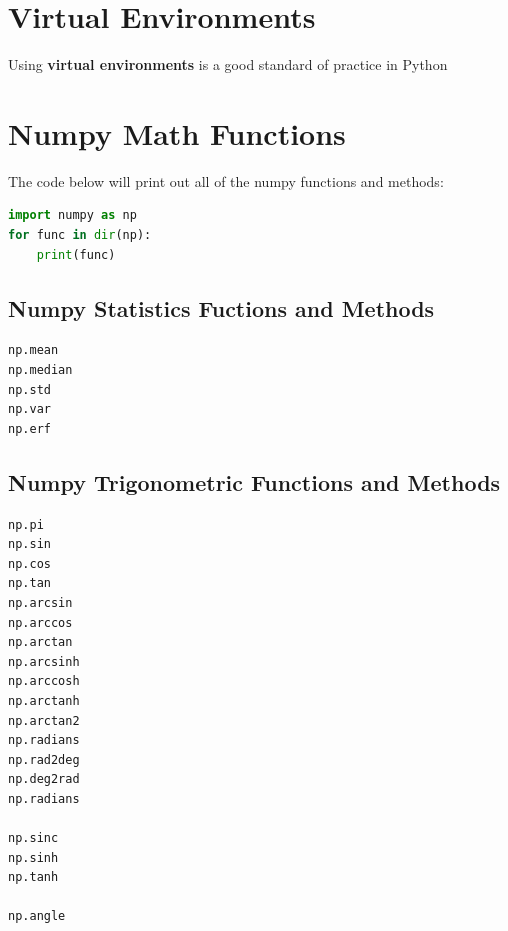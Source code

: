 \documentclass{book}
\begin{document}
    
        \section{Virtual Environments}\label{virtual-environments}
    




    
        Using \textbf{virtual environments} is a good standard of practice in
Python
    




    
        \section{Numpy Math Functions}\label{numpy-math-functions}
    




    
        The code below will print out all of the numpy functions and methods:
    




    
        \begin{lstlisting}[language=Python]
import numpy as np
for func in dir(np):
    print(func)
\end{lstlisting}
    




    
        \subsection{Numpy Statistics Fuctions and
Methods}\label{numpy-statistics-fuctions-and-methods}
    




    
        \begin{lstlisting}
np.mean
np.median
np.std
np.var
np.erf
\end{lstlisting}
    




    
        \subsection{Numpy Trigonometric Functions and
Methods}\label{numpy-trigonometric-functions-and-methods}
    




    
        \begin{lstlisting}
np.pi
np.sin
np.cos
np.tan
np.arcsin
np.arccos
np.arctan
np.arcsinh
np.arccosh
np.arctanh
np.arctan2
np.radians
np.rad2deg
np.deg2rad
np.radians

np.sinc
np.sinh
np.tanh

np.angle
\end{lstlisting}
    
\end{document}
